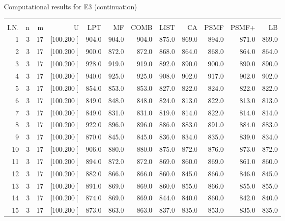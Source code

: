 \documentclass[12pt,a4paper]{article}
\begin{document}
\newpage
\begin{center}
 Computational results for E3 (continuation) {\tiny
\begin{tabular}{r r r r r r r r r r r r}\hline
    &   &   &          &        &        &        &        &        &        &        &       \\[-0.1in]
  I.N.  &  n  &  m  &  U  &  LPT  &  MF  &  COMB  &  LIST  &  CA  & PSMF &PSMF+ & LB \\[0.03in]
\hline
   1&  3& 17&[100.200   ]&   904.0&   904.0&   904.0&   875.0&   869.0&   894.0&   871.0&   869.0\\[-0.02in]
   2&  3& 17&[100.200   ]&   900.0&   872.0&   872.0&   868.0&   864.0&   868.0&   864.0&   864.0\\[-0.02in]
   3&  3& 17&[100.200   ]&   928.0&   919.0&   919.0&   892.0&   890.0&   900.0&   890.0&   890.0\\[-0.02in]
   4&  3& 17&[100.200   ]&   940.0&   925.0&   925.0&   908.0&   902.0&   917.0&   902.0&   902.0\\[-0.02in]
   5&  3& 17&[100.200   ]&   854.0&   853.0&   853.0&   827.0&   822.0&   824.0&   822.0&   822.0\\[-0.02in]
   6&  3& 17&[100.200   ]&   849.0&   848.0&   848.0&   824.0&   813.0&   822.0&   813.0&   813.0\\[-0.02in]
   7&  3& 17&[100.200   ]&   849.0&   831.0&   831.0&   819.0&   814.0&   822.0&   814.0&   814.0\\[-0.02in]
   8&  3& 17&[100.200   ]&   922.0&   896.0&   896.0&   886.0&   883.0&   891.0&   884.0&   883.0\\[-0.02in]
   9&  3& 17&[100.200   ]&   870.0&   845.0&   845.0&   836.0&   834.0&   835.0&   839.0&   834.0\\[-0.02in]
  10&  3& 17&[100.200   ]&   906.0&   880.0&   880.0&   875.0&   872.0&   876.0&   873.0&   872.0\\[-0.02in]
  11&  3& 17&[100.200   ]&   894.0&   872.0&   872.0&   869.0&   860.0&   869.0&   861.0&   860.0\\[-0.02in]
  12&  3& 17&[100.200   ]&   882.0&   866.0&   866.0&   860.0&   845.0&   866.0&   846.0&   845.0\\[-0.02in]
  13&  3& 17&[100.200   ]&   891.0&   869.0&   869.0&   860.0&   855.0&   866.0&   855.0&   855.0\\[-0.02in]
  14&  3& 17&[100.200   ]&   874.0&   869.0&   869.0&   844.0&   840.0&   860.0&   842.0&   840.0\\[-0.02in]
  15&  3& 17&[100.200   ]&   873.0&   863.0&   863.0&   837.0&   835.0&   853.0&   835.0&   835.0\\[-0.02in]

\end{tabular}}
\end{center}
\end{document}
